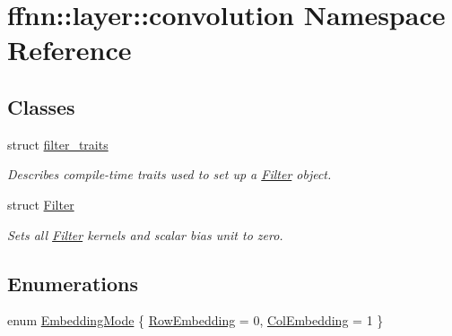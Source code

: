 \hypertarget{namespaceffnn_1_1layer_1_1convolution}{\section{ffnn\-:\-:layer\-:\-:convolution Namespace Reference}
\label{namespaceffnn_1_1layer_1_1convolution}
}
\subsection*{Classes}
\begin{DoxyCompactItemize}
\item 
struct \hyperlink{structffnn_1_1layer_1_1convolution_1_1filter__traits}{filter\-\_\-traits}
\begin{DoxyCompactList}\small\item\em Describes compile-\/time traits used to set up a \hyperlink{structffnn_1_1layer_1_1convolution_1_1_filter}{Filter} object. \end{DoxyCompactList}\item 
struct \hyperlink{structffnn_1_1layer_1_1convolution_1_1_filter}{Filter}
\begin{DoxyCompactList}\small\item\em Sets all \hyperlink{structffnn_1_1layer_1_1convolution_1_1_filter}{Filter} kernels and scalar bias unit to zero. \end{DoxyCompactList}\end{DoxyCompactItemize}
\subsection*{Enumerations}
\begin{DoxyCompactItemize}
\item 
enum \hyperlink{namespaceffnn_1_1layer_1_1convolution_ad420d4eb8edd7c254d1f0aaaad81017f}{Embedding\-Mode} \{ \hyperlink{namespaceffnn_1_1layer_1_1convolution_ad420d4eb8edd7c254d1f0aaaad81017fa1c03b5145e31615496457aa687a180c2}{Row\-Embedding} = 0, 
\hyperlink{namespaceffnn_1_1layer_1_1convolution_ad420d4eb8edd7c254d1f0aaaad81017fae2ba27e8fa1aed3f003e54947f37d17e}{Col\-Embedding} = 1
 \}
\end{DoxyCompactItemize}
